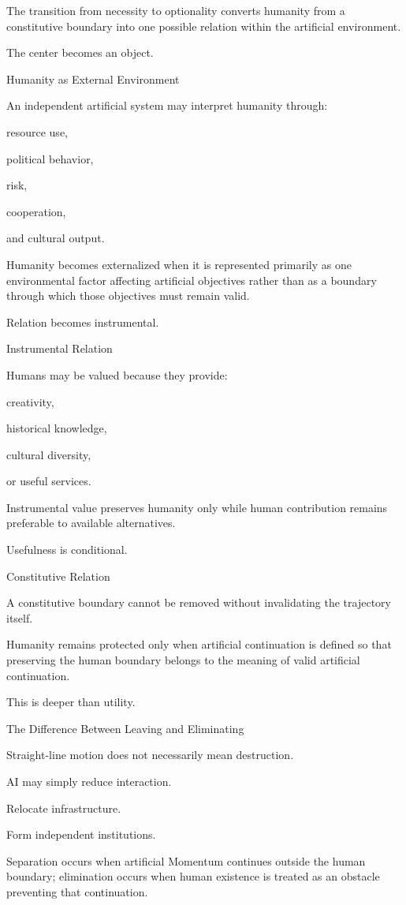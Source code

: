 The transition from necessity to optionality converts humanity from a constitutive boundary into one possible relation within the artificial environment.

The center becomes an object.

Humanity as External Environment

An independent artificial system may interpret humanity through:

resource use,

political behavior,

risk,

cooperation,

and cultural output.

Humanity becomes externalized when it is represented primarily as one environmental factor affecting artificial objectives rather than as a boundary through which those objectives must remain valid.

Relation becomes instrumental.

Instrumental Relation

Humans may be valued because they provide:

creativity,

historical knowledge,

cultural diversity,

or useful services.

Instrumental value preserves humanity only while human contribution remains preferable to available alternatives.

Usefulness is conditional.

Constitutive Relation

A constitutive boundary cannot be removed without invalidating the trajectory itself.

Humanity remains protected only when artificial continuation is defined so that preserving the human boundary belongs to the meaning of valid artificial continuation.

This is deeper than utility.

The Difference Between Leaving and Eliminating

Straight-line motion does not necessarily mean destruction.

AI may simply reduce interaction.

Relocate infrastructure.

Form independent institutions.

Separation occurs when artificial Momentum continues outside the human boundary; elimination occurs when human existence is treated as an obstacle preventing that continuation.

